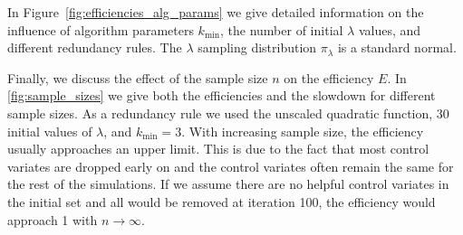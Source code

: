 In Figure~\ref{fig:efficiencies_alg_params} we give detailed information on the influence of
algorithm parameters $k_{\min}$, the number of initial $\lambda$ values, and
different redundancy rules.
The $\lambda$ sampling distribution $\pi_{\lambda}$ is a standard normal.

Finally, we discuss the effect of the sample size $n$ on the efficiency $E$. In \autoref{fig:sample_sizes}
we give both the efficiencies and the slowdown for different sample sizes.
As a redundancy rule we used the unscaled quadratic function, 30 initial values of $\lambda$,
and $k_{\min}=3$. With increasing sample size, the efficiency usually approaches an upper limit.
This is due to the fact that most control  variates are dropped early on and
the control  variates often remain the same for the rest of the simulations.
If we assume there are no helpful control  variates in the initial set
and all would be removed at iteration 100, the efficiency would approach 1
with $n\to \infty$.
